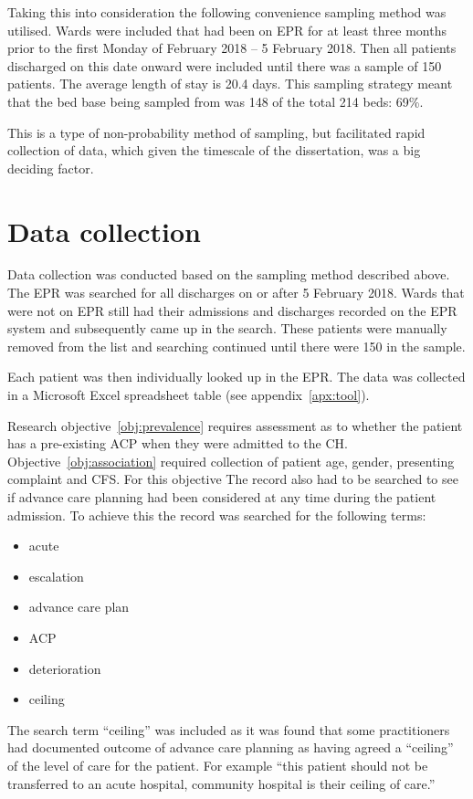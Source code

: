\documentclass
[
	12pt,
	a4paper,
	oneside,
]{report}
\begin{document}
Taking this into consideration the following convenience sampling method was 
utilised. Wards were included that had been on EPR for at least three months
prior to the first Monday of February 2018 -- 5 February 2018. Then all patients
discharged on this date onward were included until there was a sample of 150
patients. The average length of stay is 20.4 days. This sampling strategy 
meant that the bed base being sampled from was 148 of the total 214 beds: 69\%.

This is a type of non-probability method of sampling, but facilitated rapid
collection of data, which given the timescale of the dissertation, was a big
deciding factor.

\section{Data collection}

Data collection was conducted based on the sampling method described above.
The EPR was searched for all discharges on or after 5 February 2018. Wards
that were not on EPR still had their admissions and discharges recorded on the
EPR system and subsequently came up in the search. These patients were 
manually removed from the list and searching continued until there were 150
in the sample.

Each patient was then individually looked up in the EPR. The data was
collected in a Microsoft Excel spreadsheet table (see appendix~\ref{apx:tool}).

Research objective~\ref{obj:prevalence} requires assessment as to whether the 
patient has a pre-existing ACP when they were admitted to the CH. 
Objective~\ref{obj:association} required collection of patient age, gender,
presenting complaint and CFS.  
For this objective The record also had to be searched to see if advance care
planning had been considered at any time during the patient admission. To 
achieve this the record was searched for the following terms:

\begin{itemize}
\item acute
\item escalation
\item advance care plan
\item ACP
\item deterioration
\item ceiling
\end{itemize}

The search term ``ceiling'' was included as it was found that some practitioners
had documented outcome of advance care planning as having agreed a ``ceiling'' 
of the level of care for the patient. For example ``this patient should not be
transferred to an acute hospital, community hospital is their ceiling of care.''
\end{document}
